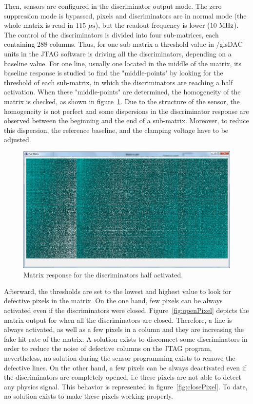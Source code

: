   Then, sensors are configured in the discriminator output mode.
  The zero suppression mode is bypassed, pixels and discriminators are in normal mode (the whole matrix is read in $115~\mu\rm{s}$), but the readout frequency is lower ($10~\rm{MHz}$).%
  The control of the discriminators is divided into four sub-matrices, each containing 288 columns.
  Thus, for one sub-matrix a threshold value in /gls{DAC} units in the \gls{JTAG} software is driving all the discriminators, depending on a baseline value.
  For one line, usually one located in the middle of the matrix, its baseline response is studied to find the "middle-points" by looking for the threshold of each sub-matrix, in which the discriminators are reaching a half activation.
  When these "middle-points" are determined, the homogeneity of the matrix is checked, as shown in figure~\ref{fig:homogeneityMi26}.
  Due to the structure of the sensor, the homogeneity is not perfect and some dispersions in the discriminator response are observed between the beginning and the end of a sub-matrix.
  Moreover, to reduce this dispersion, the reference baseline, and the clamping voltage have to be adjusted.
  
  \begin{figure}[!tbh]
    \centering
    \includegraphics[width = \textwidth]{Pictures/labTests/discri_middle.png}
    \caption{Matrix response for the discriminators half activated.}
    \label{fig:homogeneityMi26}
  \end{figure}
  
  Afterward, the thresholds are set to the lowest and highest value to look for defective pixels in the matrix.
  On the one hand, few pixels can be always activated even if the discriminators were closed.
  Figure~\ref{fig:openPixel} depicts the matrix output for when all the discriminators are closed.
  Therefore, a line is always activated, as well as a few pixels in a column and they are increasing the fake hit rate of the matrix.
  A solution exists to disconnect some discriminators in order to reduce the noise of defective columns on the \gls{JTAG} program, nevertheless, no solution during the sensor programming exists to remove the defective lines.
  On the other hand, a few pixels can be always deactivated even if the discriminators are completely opened, i.e these pixels are not able to detect any physics signal.
  This behavior is represented in figure~\ref{fig:closePixel}. 
  To date, no solution exists to make these pixels working properly.
   
